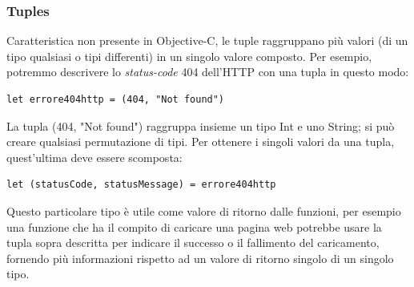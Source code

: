 \subsubsection{Tuples}
Caratteristica non presente in Objective-C, le tuple raggruppano più valori (di un tipo qualsiasi o tipi differenti) in un singolo valore composto. Per esempio, potremmo descrivere lo \textit{status-code} 404 dell'HTTP con una tupla in questo modo:
\lstset{language=[Objective]C, breakindent=40pt, breaklines}
\begin{lstlisting}
let errore404http = (404, "Not found")
\end{lstlisting}
La tupla (404, "Not found") raggruppa insieme un tipo Int e uno String; si può creare qualsiasi permutazione di tipi. Per ottenere i singoli valori da una tupla, quest'ultima deve essere scomposta:
\lstset{language=[Objective]C, breakindent=40pt, breaklines}
\begin{lstlisting}
let (statusCode, statusMessage) = errore404http
\end{lstlisting}
Questo particolare tipo è utile come valore di ritorno dalle funzioni, per esempio una funzione che ha il compito di caricare una pagina web potrebbe usare la tupla sopra descritta per indicare il successo o il fallimento del caricamento, fornendo più informazioni rispetto ad un valore di ritorno singolo di un singolo tipo.
